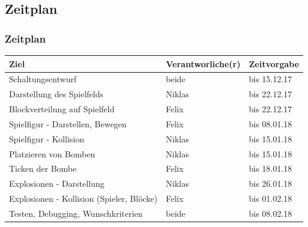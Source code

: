 \documentclass[18pt]{beamer}
\begin{document}
	\subsection{Zeitplan}
		\begin{frame}
			\frametitle{Zeitplan}
			\begin{table}[H]
				\centering
				\label{my-label}
				\begin{tabular}{l|l|l}
					Ziel                                      & Verantworliche(r) & Zeitvorgabe  \\
					\hline
					Schaltungsentwurf                         & beide           & bis 15.12.17 \\
					Darstellung des Spielfelds                & Niklas          & bis 22.12.17 \\
					Blockverteilung auf Spielfeld             & Felix           & bis 22.12.17 \\
					Spielfigur - Darstellen, Bewegen          & Felix           & bis 08.01.18 \\
					Spielfigur - Kollision                    & Niklas          & bis 15.01.18 \\
					Platzieren von Bomben                     & Niklas          & bis 15.01.18 \\
					Ticken der Bombe                          & Felix           & bis 18.01.18 \\
					Explosionen - Darstellung                 & Niklas          & bis 26.01.18 \\
					Explosionen - Kollision (Spieler, Blöcke) & Felix           & bis 01.02.18 \\
					Testen, Debugging, Wunschkriterien        & beide           & bis 08.02.18
				\end{tabular}
			\end{table}
		\end{frame}
		
\end{document}
